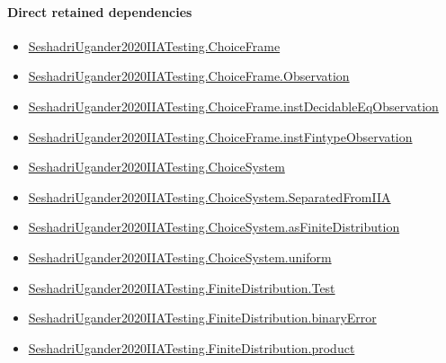 \documentclass[10pt]{article}
\begin{document}
\paragraph{Direct retained dependencies}
\begin{itemize}\raggedright
\item \hyperlink{paper-prerequisite-0b24d39c6f4d1898}{Seshadri\allowbreak{}Ugander2020\allowbreak{}IIA\allowbreak{}Testing.\allowbreak{}Choice\allowbreak{}Frame}
\item \hyperlink{paper-prerequisite-d450557e9618e377}{Seshadri\allowbreak{}Ugander2020\allowbreak{}IIA\allowbreak{}Testing.\allowbreak{}Choice\allowbreak{}Frame.\allowbreak{}Observation}
\item \hyperlink{governing-declaration-ad61eb0534c5ba6e}{Seshadri\allowbreak{}Ugander2020\allowbreak{}IIA\allowbreak{}Testing.\allowbreak{}Choice\allowbreak{}Frame.\allowbreak{}inst\allowbreak{}Decidable\allowbreak{}Eq\allowbreak{}Observation}
\item \hyperlink{governing-declaration-a7119ec24e922f45}{Seshadri\allowbreak{}Ugander2020\allowbreak{}IIA\allowbreak{}Testing.\allowbreak{}Choice\allowbreak{}Frame.\allowbreak{}inst\allowbreak{}Fintype\allowbreak{}Observation}
\item \hyperlink{paper-prerequisite-5dca52f4dfdd597a}{Seshadri\allowbreak{}Ugander2020\allowbreak{}IIA\allowbreak{}Testing.\allowbreak{}Choice\allowbreak{}System}
\item \hyperlink{paper-prerequisite-9511f5d19b7856b5}{Seshadri\allowbreak{}Ugander2020\allowbreak{}IIA\allowbreak{}Testing.\allowbreak{}Choice\allowbreak{}System.\allowbreak{}Separated\allowbreak{}From\allowbreak{}IIA}
\item \hyperlink{governing-declaration-84db14e23cd406b0}{Seshadri\allowbreak{}Ugander2020\allowbreak{}IIA\allowbreak{}Testing.\allowbreak{}Choice\allowbreak{}System.\allowbreak{}as\allowbreak{}Finite\allowbreak{}Distribution}
\item \hyperlink{governing-declaration-2f9ec7a44c87f45e}{Seshadri\allowbreak{}Ugander2020\allowbreak{}IIA\allowbreak{}Testing.\allowbreak{}Choice\allowbreak{}System.\allowbreak{}uniform}
\item \hyperlink{paper-prerequisite-1ae54af4030402fc}{Seshadri\allowbreak{}Ugander2020\allowbreak{}IIA\allowbreak{}Testing.\allowbreak{}Finite\allowbreak{}Distribution.\allowbreak{}Test}
\item \hyperlink{paper-prerequisite-0ee1ced5412e3e3f}{Seshadri\allowbreak{}Ugander2020\allowbreak{}IIA\allowbreak{}Testing.\allowbreak{}Finite\allowbreak{}Distribution.\allowbreak{}binary\allowbreak{}Error}
\item \hyperlink{governing-declaration-5fac9c490551d2cc}{Seshadri\allowbreak{}Ugander2020\allowbreak{}IIA\allowbreak{}Testing.\allowbreak{}Finite\allowbreak{}Distribution.\allowbreak{}product}
\end{itemize}
\end{document}
